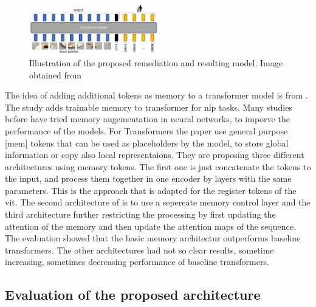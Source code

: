 \documentclass[conference]{IEEEtran}
\begin{document}
  \begin{figure}
    \centering
    \includegraphics[width=0.5\textwidth]{figures/register-architecture.png}
    \caption{Illustration of the proposed remediation and resulting model. Image obtained from \cite{registers}}
    \label{fig:register-architecture}
  \end{figure}

  The idea of adding additional tokens as memory to a transformer model is from \cite{memorytransformer}. The study adds trainable memory to transformer for \ac{nlp} tasks. Many studies before have tried memory augementation in neural networks, to imporve the performance of the models. For Transformers the paper use general purpose [mem] tokens that can be used as placeholders by the model, to store global information or copy also local representaions. They are proposing three different architectures using memory tokens. The first one is just concatenate the tokens to the input, and process them together in one encoder by layers with the same parameters. This is the approach that is adapted for the register tokens of the \ac{vit}. The second architecture of \cite{memorytransformer} is to use a sepereate memory control layer and the third architecture further restricting the processing by first updating the attention of the memory and then update the attention maps of the sequence. The evaluation showed that the basic memory architectur outperforms baseline transformers. The other architectures had not so clear results, sometime increasing, sometimes decreasing performance of baseline transformers.

  \subsection{Evaluation of the proposed architecture}
  \label{sec:registers:evaluation}
\end{document}

